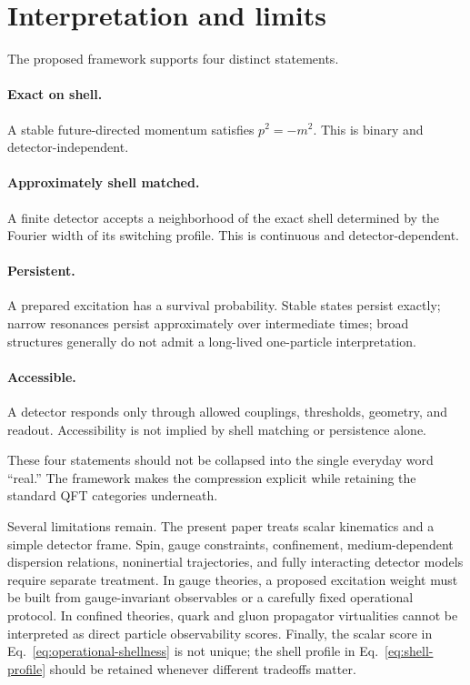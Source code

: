 \documentclass[11pt]{article}
\theoremstyle{remark}
\begin{document}
\section{Interpretation and limits}

The proposed framework supports four distinct statements.

\paragraph{Exact on shell.}
A stable future-directed momentum satisfies $p^2=-m^2$. This is binary and detector-independent.

\paragraph{Approximately shell matched.}
A finite detector accepts a neighborhood of the exact shell determined by the Fourier width of its switching profile. This is continuous and detector-dependent.

\paragraph{Persistent.}
A prepared excitation has a survival probability. Stable states persist exactly; narrow resonances persist approximately over intermediate times; broad structures generally do not admit a long-lived one-particle interpretation.

\paragraph{Accessible.}
A detector responds only through allowed couplings, thresholds, geometry, and readout. Accessibility is not implied by shell matching or persistence alone.

These four statements should not be collapsed into the single everyday word ``real.'' The framework makes the compression explicit while retaining the standard QFT categories underneath.

Several limitations remain. The present paper treats scalar kinematics and a simple detector frame. Spin, gauge constraints, confinement, medium-dependent dispersion relations, noninertial trajectories, and fully interacting detector models require separate treatment. In gauge theories, a proposed excitation weight must be built from gauge-invariant observables or a carefully fixed operational protocol. In confined theories, quark and gluon propagator virtualities cannot be interpreted as direct particle observability scores. Finally, the scalar score in Eq.~\eqref{eq:operational-shellness} is not unique; the shell profile in Eq.~\eqref{eq:shell-profile} should be retained whenever different tradeoffs matter.
\end{document}
